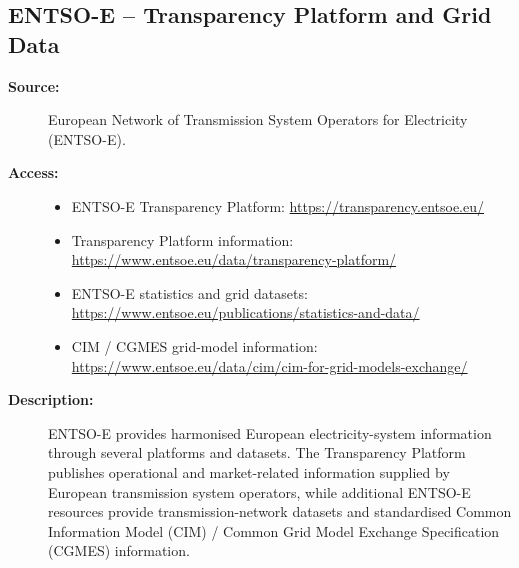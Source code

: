 
\subsection{ENTSO-E -- Transparency Platform and Grid Data}

\begin{description}

    \item[\textbf{Source:}]
    European Network of Transmission System Operators for Electricity
    (ENTSO-E).

    \item[\textbf{Access:}] \hfill
    \begin{itemize}

        \item ENTSO-E Transparency Platform:
        \url{https://transparency.entsoe.eu/}

        \item Transparency Platform information:
        \url{https://www.entsoe.eu/data/transparency-platform/}

        \item ENTSO-E statistics and grid datasets:
        \url{https://www.entsoe.eu/publications/statistics-and-data/}

        \item CIM / CGMES grid-model information:
        \url{https://www.entsoe.eu/data/cim/cim-for-grid-models-exchange/}

    \end{itemize}

    \item[\textbf{Description:}]
    ENTSO-E provides harmonised European electricity-system information
    through several platforms and datasets. The Transparency Platform
    publishes operational and market-related information supplied by
    European transmission system operators, while additional ENTSO-E
    resources provide transmission-network datasets and standardised
    Common Information Model (CIM) / Common Grid Model Exchange
    Specification (CGMES) information.


\end{description}
